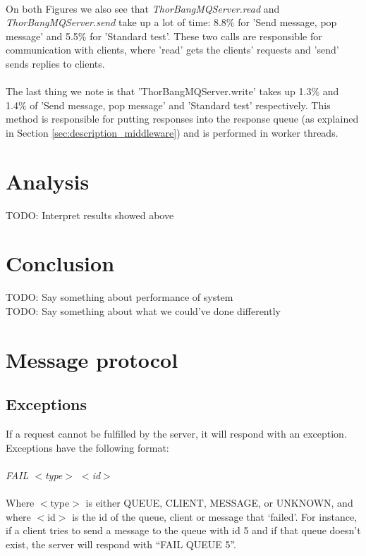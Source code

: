\documentclass{article}
\begin{document}
            ~\\
            On both Figures we also see that \textit{ThorBangMQServer.read} and \textit{ThorBangMQServer.send} take up a lot of time: 8.8\% for 'Send message, pop message' and 5.5\% for 'Standard test'. These two calls are responsible for communication with clients, where 'read' gets the clients' requests and 'send' sends replies to clients.\\
            \\
            The last thing we note is that 'ThorBangMQServer.write' takes up 1.3\% and 1.4\% of 'Send message, pop message' and 'Standard test' respectively. This method is responsible for putting responses into the response queue (as explained in Section \ref{sec:description_middleware}) and is performed in worker threads.

    \section{Analysis}
        TODO: Interpret results showed above

    \section{Conclusion}
        TODO: Say something about performance of system\\
        TODO: Say something about what we could've done differently
    \clearpage
    \appendix
        \section{Message protocol}
            \subsection{Exceptions}
                If a request cannot be fulfilled by the server, it will respond with an exception.  Exceptions have the following format:\\
                \\
                \indent\textit{FAIL $<$type$>$ $<$id$>$}\\
                \\
                Where $<$type$>$ is either QUEUE, CLIENT, MESSAGE, or UNKNOWN, and where $<$id$>$ is the id of the queue, client or message that ‘failed’. For instance, if a client tries to send a message to the queue with id 5 and if that queue doesn’t exist, the server will respond with “FAIL QUEUE 5”.
\end{document}
